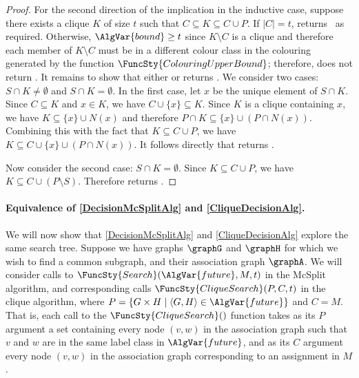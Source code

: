\begin{proof}
  For the second direction of the implication in the inductive case, suppose there exists a clique
  $K$ of size $t$ such that $C \subseteq K \subseteq C \cup P$.  If $|C|=t$, 
  returns \boolT\ as required.  Otherwise, $\AlgVar{bound} \geq t$ since $K \setminus C$ is a clique
  and therefore each member of $K \setminus C$ must be in a different colour class in the colouring
    generated by the function $\FuncSty{ColouringUpperBound}$; therefore, 
    does not return \boolF.  It remains to show that either 
   or  returns \boolT. We consider two
  cases: $S \cap K \not= \emptyset$ and $S \cap K = \emptyset$.  In the first case, let $x$ be
  the unique element of $S \cap K$.  Since $C \subseteq K$ and $x \in K$, we have
  $C \cup \{x\} \subseteq K$.
  Since $K$ is a clique containing $x$, we have $K \subseteq \{x\} \cup N(x)$ and
    therefore $P \cap K \subseteq \{x\} \cup (P \cap N(x))$.
  Combining this with the fact that $K \subseteq C \cup P$,
  we have $K \subseteq C \cup \{x\} \cup (P \cap N(x))$.  It follows directly that 
  returns \boolT.

    Now consider the second case: $S \cap K = \emptyset$.  Since $K \subseteq C \cup P$,
    we have $K \subseteq C \cup (P \setminus S)$.  Therefore 
    returns \boolT.
\end{proof}

\paragraph{Equivalence of \cref{DecisionMcSplitAlg} and \cref{CliqueDecisionAlg}.}  We will now show
that \cref{DecisionMcSplitAlg} and \cref{CliqueDecisionAlg} explore the same search tree.
Suppose we have graphs $\graphG$ and $\graphH$ for which we wish to find a common subgraph,
and their association graph $\graphA$.
We will consider calls to $\FuncSty{Search}(\AlgVar{future},M,t)$ in the McSplit algorithm,
and corresponding calls $\FuncSty{CliqueSearch}(P,C,t)$ in the clique algorithm, where
$P = \{G \times H \mid \langle G,H \rangle \in \AlgVar{future}\}$ and $C = M$.  That is,
each call to the $\FuncSty{CliqueSearch}()$ function takes as its $P$ argument a set containing
every node $(v,w)$ in the association graph such that $v$ and $w$ are in the same label class 
in $\AlgVar{future}$, and as its $C$ argument every node $(v,w)$ in the association graph corresponding
to an assignment in $M$.

